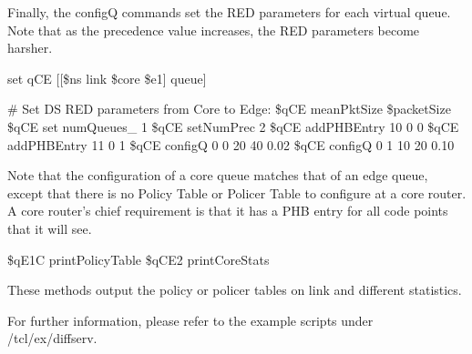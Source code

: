 Finally, the configQ commands set the RED parameters for each virtual queue.  Note that as the precedence value increases, the RED parameters become harsher.

\begin{program}

set qCE [[\$ns link \$core \$e1] queue]

# Set DS RED parameters from Core to Edge:
\$qCE meanPktSize \$packetSize
\$qCE set numQueues_ 1
\$qCE setNumPrec 2
\$qCE addPHBEntry 10 0 0
\$qCE addPHBEntry 11 0 1
\$qCE configQ 0 0 20 40 0.02
\$qCE configQ 0 1 10 20 0.10

\end{program}

Note that the configuration of a core queue matches that of an edge queue, except that there is no Policy Table or Policer Table to configure at a core router.  A core router's chief requirement is that it has a PHB entry for all code points that it will see.

\begin{program}
\$qE1C printPolicyTable
\$qCE2 printCoreStats
\end{program}

These methods output the policy or policer tables on link and different statistics.  

For further information, please refer to the example scripts under \ns/tcl/ex/diffserv.
